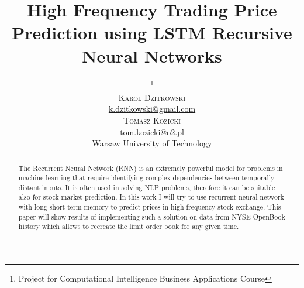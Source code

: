 \documentclass[twoside]{article}
\title{\vspace{-15mm}\fontsize{24pt}{10pt}\selectfont\textbf{High Frequency Trading Price Prediction using LSTM Recursive Neural Networks}} %
\author{
\large
\thanks{Project for Computational Intelligence Business Applications Course}\\[2mm] %
\textsc{Karol Dzitkowski}\\
\normalsize \href{mailto:k.dzitkowski@gmail.com}{k.dzitkowski@gmail.com} \\
\textsc{Tomasz Kozicki}\\
\normalsize \href{mailto:tom.kozicki@o2.pl}{tom.kozicki@o2.pl} \\
\normalsize Warsaw University of Technology\\
\vspace{-5mm}
}
\date{}
\begin{document}
\maketitle %

\thispagestyle{fancy} %


\begin{abstract}

The Recurrent Neural Network (RNN) is an extremely powerful model for problems in machine learning that require identifying complex dependencies between temporally distant inputs. It is often used in solving NLP problems, therefore it can be suitable also for stock market prediction. 
In this work I will try to use recurrent neural network with long short term memory to predict prices in high frequency stock exchange. This paper will show results of implementing such a solution on data from NYSE OpenBook history which allows to recreate the limit order book for any given time.

\end{abstract}

\end{document}
